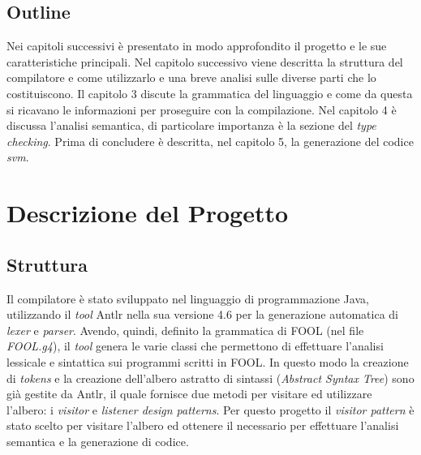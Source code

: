 \documentclass{scrreprt}
\begin{document}
\section{Outline}
Nei capitoli successivi è presentato in modo approfondito il progetto e le sue caratteristiche principali. Nel capitolo successivo viene descritta la struttura del compilatore e come utilizzarlo e una breve analisi sulle diverse parti che lo costituiscono. Il capitolo 3 discute la grammatica del linguaggio e come da questa si ricavano le informazioni per proseguire con la compilazione. Nel capitolo 4 è discussa l'analisi semantica, di particolare importanza è la sezione del \textit{type checking}. Prima di concludere è descritta, nel capitolo 5, la generazione del codice \textit{svm}.

\chapter{Descrizione del Progetto}
\section{Struttura}
Il compilatore è stato sviluppato nel linguaggio di programmazione Java, utilizzando il \textit{tool} Antlr nella sua versione 4.6 per la generazione automatica di \textit{lexer} e \textit{parser}.
Avendo, quindi, definito la grammatica di FOOL (nel file \textit{FOOL.g4}), il \textit{tool} genera le varie classi che permettono di effettuare l'analisi lessicale e sintattica sui programmi scritti in FOOL.
In questo modo la creazione di \textit{tokens} e la creazione dell'albero astratto di sintassi (\textit{Abstract Syntax Tree}) sono già gestite da Antlr, il quale fornisce due metodi per visitare ed utilizzare l'albero: i \textit{visitor} e \textit{listener design patterns}.
Per questo progetto il \textit{visitor pattern} è stato scelto per visitare l'albero ed ottenere il necessario per effettuare l'analisi semantica e la generazione di codice.\\
\end{document}
